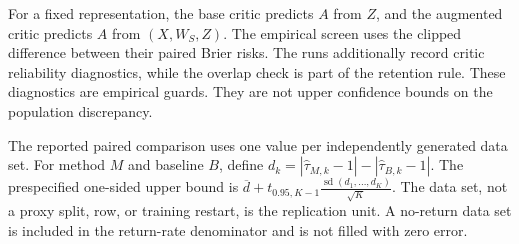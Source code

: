 For a fixed representation, the base critic predicts $A$ from $Z$, and the augmented critic predicts $A$ from $(X,W_S,Z)$. The empirical screen uses the clipped difference between their paired Brier risks. The runs additionally record critic reliability diagnostics, while the overlap check is part of the retention rule. These diagnostics are empirical guards. They are not upper confidence bounds on the population discrepancy.

The reported paired comparison uses one value per independently generated data set. For method $M$ and baseline $B$, define
\(d_k=|\widehat\tau_{M,k}-1|-|\widehat\tau_{B,k}-1|.\)
The prespecified one-sided upper bound is
\(\overline d+t_{0.95,K-1}\frac{\operatorname{sd}(d_1,\ldots,d_K)}{\sqrt K}.\)
The data set, not a proxy split, row, or training restart, is the replication unit. A no-return data set is included in the return-rate denominator and is not filled with zero error.

